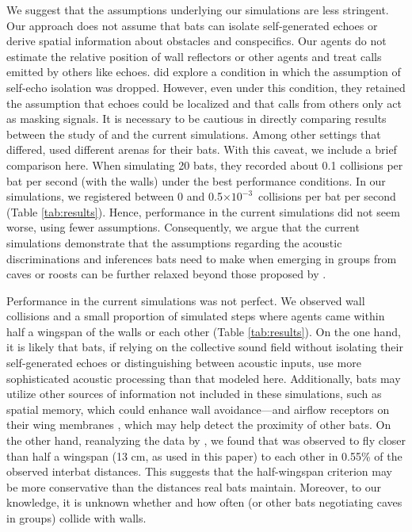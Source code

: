 \documentclass[a4paper, 11pt]{article}
\newcommand{\thou}{$\times 10^{-3}$}
\begin{document}
We suggest that the assumptions underlying our simulations are less stringent. Our approach does not assume that bats can isolate self-generated echoes or derive spatial information about obstacles and conspecifics. Our agents do not estimate the relative position of wall reflectors or other agents and treat calls emitted by others like echoes. \citet{Mazar2024} did explore a condition in which the assumption of self-echo isolation was dropped. However, even under this condition, they retained the assumption that echoes could be localized and that calls from others only act as masking signals. It is necessary to be cautious in directly comparing results between the study of \citet{Mazar2024} and the current simulations. Among other settings that differed, \citet{Mazar2024} used different arenas for their bats. With this caveat, we include a brief comparison here. When simulating 20 bats, they recorded about 0.1 collisions per bat per second (with the walls) under the best performance conditions. In our simulations, we registered between 0 and 0.5\thou\ collisions per bat per second (Table \ref{tab:results}). Hence, performance in the current simulations did not seem worse, using fewer assumptions. Consequently, we argue that the current simulations demonstrate that the assumptions regarding the acoustic discriminations and inferences bats need to make when emerging in groups from caves or roosts can be further relaxed beyond those proposed by \citet{Mazar2024}.

Performance in the current simulations was not perfect. We observed wall collisions and a small proportion of simulated steps where agents came within half a wingspan of the walls or each other (Table \ref{tab:results}). On the one hand, it is likely that bats, if relying on the collective sound field without isolating their self-generated echoes or distinguishing between acoustic inputs, use more sophisticated acoustic processing than that modeled here. Additionally, bats may utilize other sources of information not included in these simulations, such as spatial memory, which could enhance wall avoidance—and airflow receptors on their wing membranes \citep{Marshall2015}, which may help detect the proximity of other bats. On the other hand, reanalyzing the data by \citet{Weesner2023}, we found that  was observed to fly closer than half a wingspan (13 cm, as used in this paper) to each other in 0.55\% of the observed interbat distances. This suggests that the half-wingspan criterion may be more conservative than the distances real bats maintain. Moreover, to our knowledge, it is unknown whether and how often  (or other bats negotiating caves in groups) collide with walls.
\end{document}
